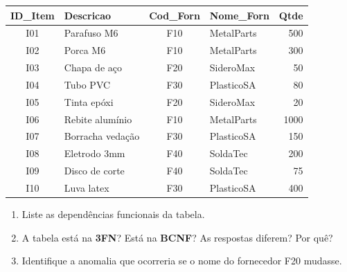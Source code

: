 \documentclass[12pt]{article}
\begin{document}
\begin{enumerate}[label=\textbf{Questão \arabic*:}, leftmargin=*]
  \vspace{0.2cm}
  \centering
  \begin{tabular}{|c|l|c|l|r|}
    \hline
    \textbf{ID\_Item} & \textbf{Descricao} & \textbf{Cod\_Forn} & \textbf{Nome\_Forn} & \textbf{Qtde} \\ \hline
    I01 & Parafuso M6   & F10 & MetalParts  & 500 \\ \hline
    I02 & Porca M6      & F10 & MetalParts  & 300 \\ \hline
    I03 & Chapa de aço  & F20 & SideroMax   & 50  \\ \hline
    I04 & Tubo PVC      & F30 & PlasticoSA  & 80  \\ \hline
    I05 & Tinta epóxi   & F20 & SideroMax   & 20  \\ \hline
    I06 & Rebite alumínio & F10 & MetalParts & 1000\\ \hline
    I07 & Borracha vedação & F30 & PlasticoSA & 150\\ \hline
    I08 & Eletrodo 3mm  & F40 & SoldaTec    & 200 \\ \hline
    I09 & Disco de corte & F40 & SoldaTec   & 75  \\ \hline
    I10 & Luva latex     & F30 & PlasticoSA & 400 \\ \hline
  \end{tabular}
  \flushleft
  \vspace{0.2cm}
  \begin{enumerate}[label=\alph*)]
    \item Liste as dependências funcionais da tabela.
    \item A tabela está na \textbf{3FN}? Está na \textbf{BCNF}? As respostas diferem? Por quê?
    \item Identifique a anomalia que ocorreria se o nome do fornecedor F20 mudasse.
  \end{enumerate}


  \vspace{0.4cm}

  \vspace{0.4cm}


\end{enumerate}
\end{document}
